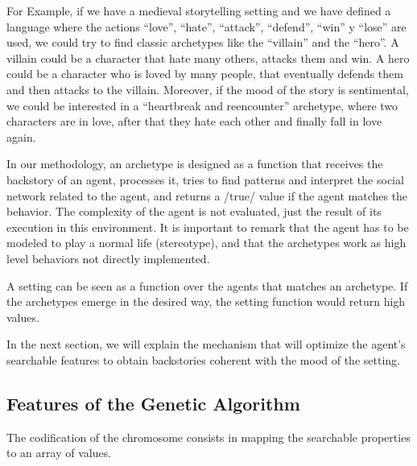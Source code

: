 \documentclass{sig-alternate}
\begin{document}
For Example, if we have a medieval storytelling setting and we have defined a language where the actions ``love'', ``hate'', ``attack'', ``defend'', ``win'' y ``lose'' are used, we could try to find classic 
archetypes like the ``villain'' and the ``hero''. A villain could be a character that hate many others, attacks them and win. A hero could be a character who is loved by many people, that eventually defends them and then attacks to the villain. Moreover, if the mood of the story is sentimental, we could be interested in a ``heartbreak and reencounter'' archetype, where two characters are in love, after that they hate each other and finally fall in love again.

In our methodology, an archetype is designed as a function that receives the backstory of an agent, processes it, tries to find patterns and interpret the social network related to the agent, and returns a /true/ value if the agent matches the behavior. 
The complexity of the agent is not evaluated, just the result of its execution in this environment. It is important to remark that the agent has to be modeled to play a normal life (stereotype), and that the archetypes work as high level behaviors not directly implemented.

A setting can be seen as a function over the agents that matches an archetype. If the archetypes emerge in the desired way, the setting function would return high values.

In the next section, we will explain the mechanism that will optimize the agent's searchable features to obtain backstories coherent with the mood of the setting.

\subsection{Features of the Genetic Algorithm}


The codification of the chromosome consists in mapping the searchable properties to an array of values. %
\end{document}
